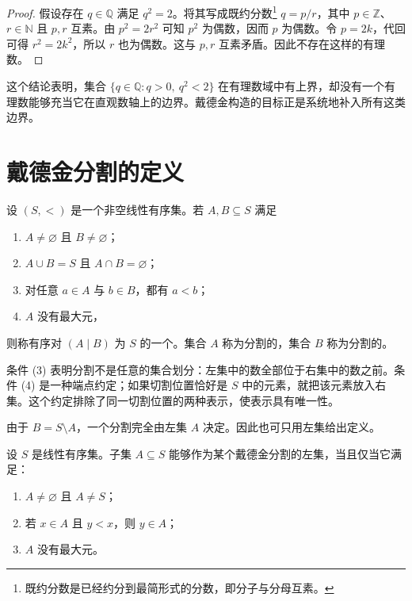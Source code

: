 \documentclass[UTF8,12pt,a4paper,fontset=fandol]{ctexbook}
\begin{document}
\begin{proof}
假设存在 $q\in\mathbb{Q}$ 满足 $q^2=2$。将其写成既约分数\footnote{既约分数是已经约分到最简形式的分数，即分子与分母互素。} $q=p/r$，其中 $p\in\mathbb{Z}$、$r\in\mathbb{N}$ 且 $p,r$ 互素。由 $p^2=2r^2$ 可知 $p^2$ 为偶数，因而 $p$ 为偶数。令 $p=2k$，代回可得 $r^2=2k^2$，所以 $r$ 也为偶数。这与 $p,r$ 互素矛盾。因此不存在这样的有理数。
\end{proof}

这个结论表明，集合 $\{q\in\mathbb{Q}:q>0,\ q^2<2\}$ 在有理数域中有上界，却没有一个有理数能够充当它在直观数轴上的边界。戴德金构造的目标正是系统地补入所有这类边界。

\section{戴德金分割的定义}

\begin{definition}[戴德金分割]
设 $(S,<)$ 是一个非空线性有序集。若 $A,B\subseteq S$ 满足
\begin{enumerate}[label=(\arabic*)]
  \item $A\ne\varnothing$ 且 $B\ne\varnothing$；
  \item $A\cup B=S$ 且 $A\cap B=\varnothing$；
  \item 对任意 $a\in A$ 与 $b\in B$，都有 $a<b$；
  \item $A$ 没有最大元，
\end{enumerate}
则称有序对 $(A\mid B)$ 为 $S$ 的一个。集合 $A$ 称为分割的，集合 $B$ 称为分割的。
\end{definition}

条件 (3) 表明分割不是任意的集合划分：左集中的数全部位于右集中的数之前。条件 (4) 是一种端点约定；如果切割位置恰好是 $S$ 中的元素，就把该元素放入右集。这个约定排除了同一切割位置的两种表示，使表示具有唯一性。

由于 $B=S\setminus A$，一个分割完全由左集 $A$ 决定。因此也可只用左集给出定义。

\begin{proposition}[左集形式]
设 $S$ 是线性有序集。子集 $A\subseteq S$ 能够作为某个戴德金分割的左集，当且仅当它满足：
\begin{enumerate}[label=(\arabic*)]
  \item $A\ne\varnothing$ 且 $A\ne S$；
  \item 若 $x\in A$ 且 $y<x$，则 $y\in A$；
  \item $A$ 没有最大元。
\end{enumerate}
\end{proposition}
\end{document}
